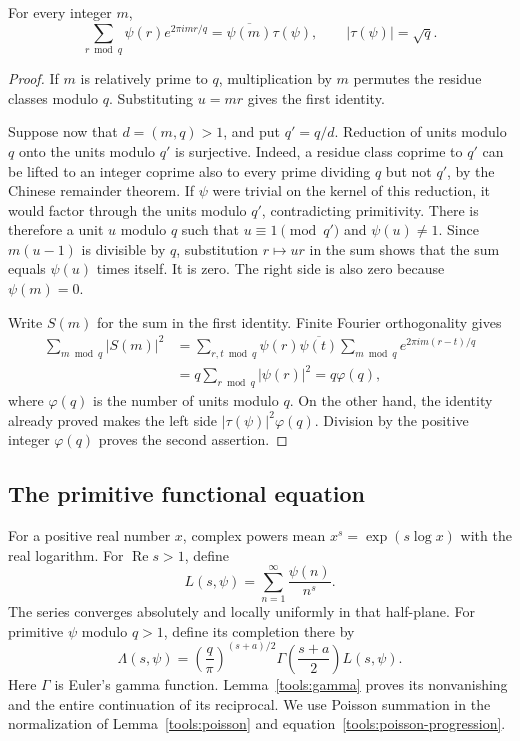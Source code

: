 \begin{lemma}\label{prim:gauss}
For every integer $m$,
\[
 \sum_{r\bmod q}\psi(r)e^{2\pi i mr/q}
   =\overline{\psi(m)}\tau(\psi),
 \qquad |\tau(\psi)|=\sqrt q.
\]
\end{lemma}

\begin{proof}
If $m$ is relatively prime to $q$, multiplication by $m$ permutes the
residue classes modulo $q$.  Substituting $u=mr$ gives the first identity.

Suppose now that $d=(m,q)>1$, and put $q'=q/d$.  Reduction of units modulo
$q$ onto the units modulo $q'$ is surjective.  Indeed, a residue class
coprime to $q'$ can be lifted to an integer coprime also to every prime
dividing $q$ but not $q'$, by the Chinese remainder theorem.  If $\psi$
were trivial on the kernel of this reduction, it would factor through
the units modulo $q'$, contradicting primitivity.  There is therefore a
unit $u$ modulo $q$ such that $u\equiv 1\pmod {q'}$ and $\psi(u)\neq1$.
Since $m(u-1)$ is divisible by $q$, substitution $r\mapsto ur$ in the sum
shows that the sum equals $\psi(u)$ times itself.  It is zero.  The right
side is also zero because $\psi(m)=0$.

Write $S(m)$ for the sum in the first identity.  Finite Fourier
orthogonality gives
\begin{align*}
 \sum_{m\bmod q}|S(m)|^2
 &=\sum_{r,t\bmod q}\psi(r)\overline{\psi(t)}
       \sum_{m\bmod q}e^{2\pi i m(r-t)/q}\\
 &=q\sum_{r\bmod q}|\psi(r)|^2=q\varphi(q),
\end{align*}
where $\varphi(q)$ is the number of units modulo $q$.
On the other hand, the identity already proved makes the left side
$|\tau(\psi)|^2\varphi(q)$.  Division by the positive integer
$\varphi(q)$ proves the second assertion.
\end{proof}

\subsection{The primitive functional equation}

For a positive real number $x$, complex powers mean
$x^s=\exp(s\log x)$ with the real logarithm.
For $\operatorname{Re}s>1$, define
\[
 L(s,\psi)=\sum_{n=1}^{\infty}\frac{\psi(n)}{n^s}.
\]
The series converges absolutely and locally uniformly in that half-plane.
For primitive $\psi$ modulo $q>1$, define its completion there by
\[
 \Lambda(s,\psi)
 =\left(\frac q\pi\right)^{(s+a)/2}
     \Gamma\left(\frac{s+a}{2}\right)L(s,\psi).
\]
Here $\Gamma$ is Euler's gamma function. Lemma~\ref{tools:gamma}
proves its nonvanishing and the entire continuation of its reciprocal.
We use Poisson summation in the normalization of
Lemma~\ref{tools:poisson} and equation~\eqref{tools:poisson-progression}.

